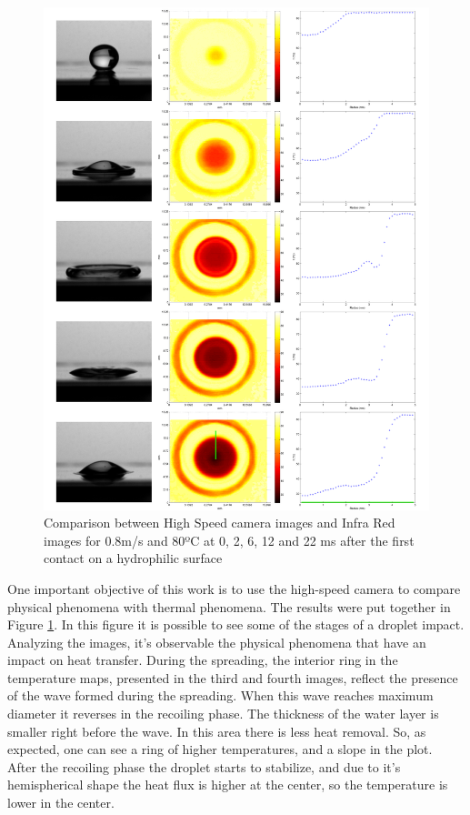 \begin{figure}
\centering
\includegraphics[width=1\linewidth]{Figures/5.Chapter/IRvsHR.png}
\caption{Comparison between High Speed camera images and Infra Red images for 0.8m/s and 80ºC at 0, 2, 6, 12 and 22 ms after the first contact on a hydrophilic surface}
\label{fig:irvshr}
\end{figure}

\par One important objective of this work is to use the high-speed camera to compare physical phenomena with thermal phenomena. The results were put together in Figure \ref{fig:irvshr}. In this figure it is possible to see some of the stages of a droplet impact. Analyzing the images, it's observable the physical phenomena that have an impact on heat transfer. During the spreading, the interior ring in the temperature maps, presented in the third and fourth images, reflect the presence of the wave formed during the spreading. When this wave reaches maximum diameter it reverses in the recoiling phase. The thickness of the water layer is smaller right before the wave. In this area there is less heat removal. So, as expected, one can see a ring of higher temperatures, and a slope in the plot. After the recoiling phase the droplet starts to stabilize, and due to it's hemispherical shape the heat flux is higher at the center, so the temperature is lower in the center.

